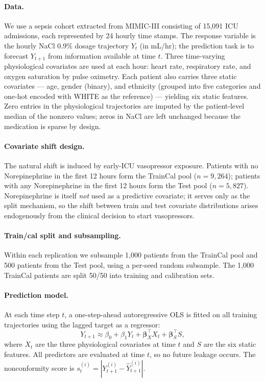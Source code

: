 \paragraph{Data.}
We use a sepsis cohort extracted from MIMIC-III consisting of 15{,}091 ICU
admissions, each represented by 24 hourly time stamps.  The response variable
is the hourly NaCl 0.9\% dosage trajectory $Y_t$ (in mL/hr); the prediction
task is to forecast $Y_{t+1}$ from information available at time $t$.  Three
time-varying physiological covariates are used at each hour: heart rate,
respiratory rate, and oxygen saturation by pulse oximetry.  Each patient
also carries three static covariates --- age, gender (binary), and ethnicity
(grouped into five categories and one-hot encoded with WHITE as the
reference) --- yielding six static features.  Zero entries in the
physiological trajectories are imputed by the patient-level median of the
nonzero values; zeros in NaCl are left unchanged because the medication is
sparse by design.

\paragraph{Covariate shift design.}
The natural shift is induced by early-ICU vasopressor exposure.  Patients
with no Norepinephrine in the first 12 hours form the TrainCal pool
($n = 9{,}264$); patients with any Norepinephrine in the first 12 hours form
the Test pool ($n = 5{,}827$).  Norepinephrine is itself \emph{not} used as
a predictive covariate; it serves only as the split mechanism, so the shift
between train and test covariate distributions arises endogenously from the
clinical decision to start vasopressors.

\paragraph{Train/cal split and subsampling.}
Within each replication we subsample 1{,}000 patients from the TrainCal pool
and 500 patients from the Test pool, using a per-seed random subsample.  The
1{,}000 TrainCal patients are split 50/50 into training and calibration sets.

\paragraph{Prediction model.}
At each time step $t$, a one-step-ahead autoregressive OLS is fitted on all
training trajectories using the lagged target as a regressor:
%
\[
  Y_{t+1} \approx \beta_0 + \beta_1 Y_t + \boldsymbol{\beta}_X^{\!\top} X_t
                + \boldsymbol{\beta}_S^{\!\top} S,
\]
%
where $X_t$ are the three physiological covariates at time $t$ and $S$ are
the six static features.  All predictors are evaluated at time $t$, so no
future leakage occurs.  The nonconformity score is
$s_t^{(i)} = |Y_{t+1}^{(i)} - \hat Y_{t+1}^{(i)}|$.

